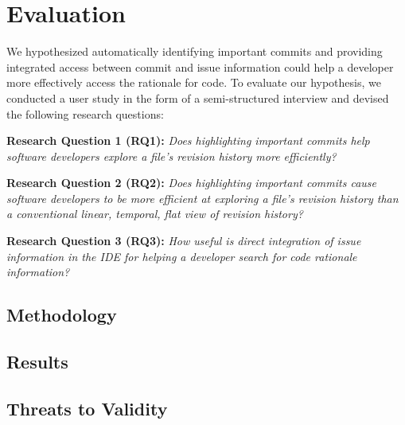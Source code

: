 \chapter{Evaluation}
\label{ch:Evaluation}

We hypothesized automatically identifying important commits and providing integrated access between commit and issue information could help a developer more effectively access the rationale for code.
To evaluate our hypothesis, we conducted a user study in the form of a semi-structured interview and devised the following research questions:

\textbf{Research Question 1 (RQ1):} \textit{Does highlighting important commits help software developers explore a file’s revision history more efficiently?}

\textbf{Research Question 2 (RQ2):} \textit{Does highlighting important commits cause software developers to be more efficient at exploring a file’s revision history than a conventional linear, temporal, flat view of revision history?}

\textbf{Research Question 3 (RQ3):} \textit{How useful is direct integration of issue information in the IDE for helping a developer search for code rationale information?}

\section{Methodology}
\label{sec:Methodology}

\section{Results}
\label{sec:Results}

\section{Threats to Validity}
\label{sec:Threads-to-Validity}

\endinput

Any text after an \endinput is ignored.
You could put scraps here or things in progress.